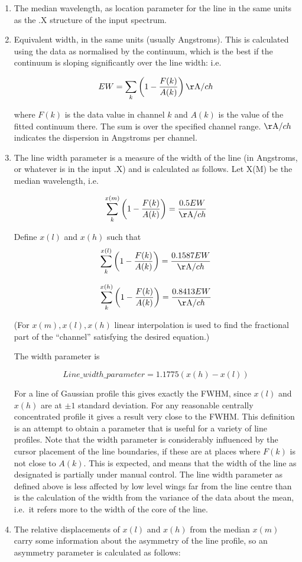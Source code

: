 \begin{enumerate}
\item The median wavelength, as location parameter for the line in the
   same units as the .X structure of the input spectrum.
\item Equivalent width, in the same units (usually Angstroms). This is
   calculated using the data as normalised by the continuum, which is
   the best if the continuum is sloping significantly over the line
   width: i.e.

   $$EW = \sum_k \left( 1 - {F(k)\over A(k)} \right) {{\rm \AA}/ch}$$

   where $F(k)$ is the data value in channel $k$ and $A(k)$ is the value
   of the fitted continuum there. The sum is over the specified channel
   range. ${\rm \AA}/ch$ indicates the dispersion in Angstroms per
   channel.
\item The line width parameter is a measure of the width of the line (in
   Angstroms, or whatever is in the input .X) and is calculated as
   follows.  Let X(M) be the median wavelength, i.e.\

   $$\sum_k^{x(m)} \left( 1 - {F(k)\over A(k)} \right) = {0.5 EW \over {\rm \AA}/ch}$$

   Define $x(l)$ and $x(h)$ such that 
   $$\sum_k^{x(l)} \left( 1 - {F(k)\over A(k)} \right)
      = {0.1587 EW \over {\rm \AA}/ch}$$

   $$\sum_k^{x(h)} \left( 1 - {F(k)\over A(k)} \right)
      = {0.8413 EW \over {\rm \AA}/ch}$$

   (For $x(m), x(l), x(h)$ linear interpolation is used to find the
   fractional part of the ``channel'' satisfying the desired equation.)

   The width parameter is

   $$Line\_width\_parameter = 1.1775 (x(h)-x(l))$$

   For a line of Gaussian profile this gives exactly the FWHM, since
   $x(l)$ and $x(h)$ are at $\pm 1$ standard deviation. For any
   reasonable centrally concentrated profile it gives a result very
   close to the FWHM. This definition is an attempt to obtain a
   parameter that is useful for a variety of line profiles. Note that
   the width parameter is considerably influenced by the cursor
   placement of the line boundaries, if these are at places where $F(k)$
   is not close to $A(k)$.  This is expected, and means that the width
   of the line as designated is partially under manual control. The line
   width parameter as defined above is less affected by low level wings
   far from the line centre than is the calculation of the width from
   the variance of the data about the mean, i.e.\ it refers more to the
   width of the core of the line.
\item The relative displacements of $x(l)$ and $x(h)$ from the median
   $x(m)$ carry some information about the asymmetry of the line
   profile, so an asymmetry parameter is calculated as follows:


\end{enumerate}

